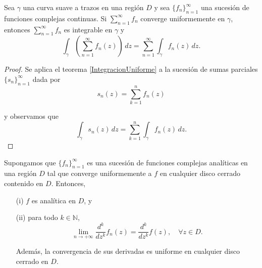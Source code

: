 \begin{corolario} \label{IntegracionSerieUniforme}
Sea $\gamma$ una curva suave a trazos en una región $D$ y sea $\{f_n\}_{n=1}^{\infty}$ una sucesión de funciones complejas continuas. Si  $\sum\limits_{n=1}^{\infty} f_n$ converge uniformemente en $\gamma$, entonces $\sum\limits_{n=1}^{\infty} f_n$ es integrable en $\gamma$ y 
$$\int_{\gamma} \left( \sum_{n=1}^{\infty} f_n(z)\right)\, dz = \sum_{n=1}^{\infty} \int_{\gamma} f_n(z) \, dz.$$
\end{corolario}

\begin{proof}
Se aplica el teorema \ref{IntegracionUniforme} a la sucesión de sumas parciales $\{s_n\}_{n=1}^{\infty}$ dada por
$$s_n(z) = \sum_{k=1}^n f_n(z)$$

y observamos que 
$$\int_{\gamma} s_n(z) \, dz = \sum_{k=1}^n \int_{\gamma} f_n(z) \,dz.$$

\end{proof}

\begin{teorema} \label{DerivadasUniforme}
Supongamos que $\{f_n\}_{n=1}^{\infty}$ es una sucesión de funciones complejas analíticas en una región $D$ tal que converge uniformemente a $f$ en cualquier disco cerrado contenido en $D$. Entonces,
\begin{itemize}
    \item[(i)] $f$ es analítica en $D$, y
    
    \item[(ii)] para todo $k \in \mathbb{N}$, 
    $$\lim_{n\to + \infty}\frac{d^k}{d z^k} f_n(z) = \frac{d^k}{dz^k}f(z), \quad \forall z \in D.$$
    
    Además, la convergencia de sus derivadas es uniforme en cualquier disco cerrado en $D$.
\end{itemize}
\end{teorema}

